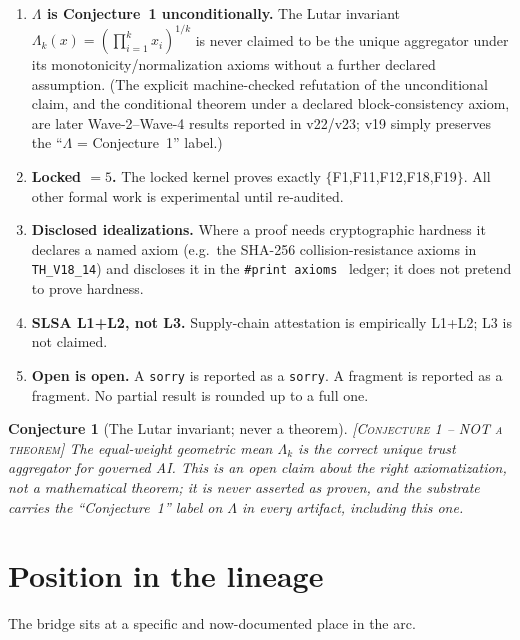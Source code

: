 \documentclass[11pt]{article}
\theoremstyle{plain}
\newtheorem{conjecture}{Conjecture}
\theoremstyle{definition}
\theoremstyle{remark}
\newcommand{\statusConj}{\textcolor{red!70!black}{\textsc{[Conjecture 1 -- NOT a theorem]}}}
\newcommand{\La}{\Lambda}
\newcommand{\printax}[1]{\texttt{\#print axioms}~\texttt{#1}}
\begin{document}
\begin{enumerate}[leftmargin=2em,itemsep=3pt]
  \item \textbf{$\La$ is Conjecture~1 unconditionally.} The Lutar invariant
    $\La_k(x)=(\prod_{i=1}^k x_i)^{1/k}$ is never claimed to be the unique aggregator
    under its monotonicity/normalization axioms without a further declared assumption.
    (The explicit machine-checked refutation of the unconditional claim, and the
    conditional theorem under a declared block-consistency axiom, are later
    Wave-2--Wave-4 results reported in v22/v23; v19 simply preserves the
    ``$\La$ = Conjecture~1'' label.)
  \item \textbf{Locked $=5$.} The locked kernel proves exactly $\{$F1,F11,F12,F18,F19$\}$.
    All other formal work is experimental until re-audited.
  \item \textbf{Disclosed idealizations.} Where a proof needs cryptographic hardness it
    declares a named axiom (e.g.\ the SHA-256 collision-resistance axioms in
    \texttt{TH\_V18\_14}) and discloses it in the \printax{} ledger; it does not pretend
    to prove hardness.
  \item \textbf{SLSA L1+L2, not L3.} Supply-chain attestation is empirically L1+L2; L3
    is not claimed.
  \item \textbf{Open is open.} A \texttt{sorry} is reported as a \texttt{sorry}. A
    fragment is reported as a fragment. No partial result is rounded up to a full one.
\end{enumerate}

\begin{conjecture}[The Lutar invariant; never a theorem]
\label{conj:lambda}
\statusConj\;
The equal-weight geometric mean $\La_k$ is the correct unique trust aggregator for
governed AI. This is an open claim about the \emph{right} axiomatization, not a
mathematical theorem; it is never asserted as proven, and the substrate carries the
``Conjecture~1'' label on $\La$ in every artifact, including this one.
\end{conjecture}

\section{Position in the lineage}
\label{sec:lineage}

The bridge sits at a specific and now-documented place in the arc.
\end{document}
